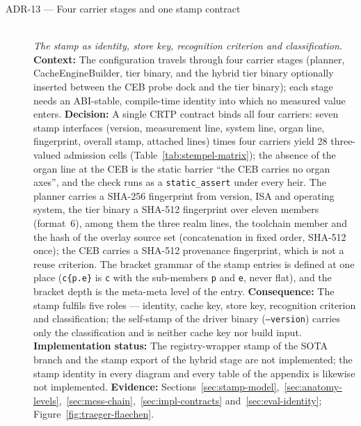 \begin{description}
  \item[ADR-13 --- Four carrier stages and one stamp contract]\hfill\\
  \emph{The stamp as identity, store key, recognition criterion and classification.}\hfill\\
  \textbf{Context:} The configuration travels through four carrier stages (planner,
  CacheEngineBuilder, tier binary, and the hybrid tier binary optionally inserted between the CEB probe
  dock and the tier binary); each stage needs an ABI-stable, compile-time identity into which no
  measured value enters.
  \textbf{Decision:} A single CRTP contract binds all four carriers: seven stamp interfaces
  (version, measurement line, system line, organ line, fingerprint, overall stamp, attached lines)
  times four carriers yield 28 three-valued admission cells (Table~\ref{tab:stempel-matrix}); the
  absence of the organ line at the CEB is the static barrier \enquote{the CEB carries no organ
  axes}, and the check runs as a \texttt{static\_assert} under every heir. The planner carries a
  SHA-256 fingerprint from version, ISA and operating system, the tier binary a SHA-512 fingerprint
  over eleven members (format~6), among them the three realm lines, the toolchain member and the
  hash of the overlay source set (concatenation in fixed order, SHA-512 once); the CEB carries a
  SHA-512 provenance fingerprint, which is not a reuse criterion. The bracket grammar of the stamp
  entries is defined at one place (\texttt{c\{p.e\}} is \texttt{c} with the sub-members \texttt{p}
  and \texttt{e}, never flat), and the bracket depth is the meta-meta level of the entry.
  \textbf{Consequence:} The stamp fulfils five roles --- identity, cache key, store key, recognition
  criterion and classification; the self-stamp of the driver binary (\texttt{--version}) carries
  only the classification and is neither cache key nor build input.
  \textbf{Implementation status:} The registry-wrapper stamp of the SOTA branch and the stamp
  export of the hybrid stage are not implemented; the stamp identity in every diagram and every
  table of the appendix is likewise not implemented.
  \textbf{Evidence:} Sections~\ref{sec:stamp-model},~\ref{sec:anatomy-levels},~\ref{sec:mess-chain},~\ref{sec:impl-contracts}
  and~\ref{sec:eval-identity}; Figure~\ref{fig:traeger-flaechen}.


\end{description}
